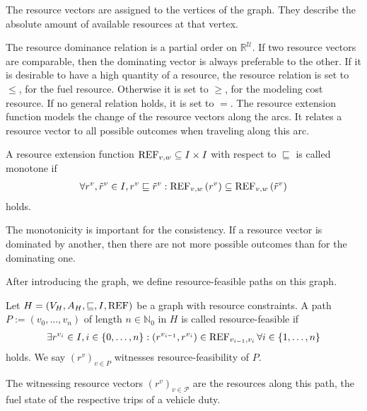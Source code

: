 The resource vectors are assigned to the vertices of the graph. They describe the absolute amount of available resources at that vertex.

The resource dominance relation is a partial order on $\mathbb{R}^{\mathcal{U}}$. If two resource vectors are comparable, then the dominating vector is always preferable to the other. If it is desirable to have a high quantity of a resource, the resource relation is set to $\leq$, \eg for the fuel resource. Otherwise it is set to $\geq$, \eg for the modeling cost resource. If no general relation holds, it is set to $=$. The resource extension function models the change of the resource vectors along the arcs. It relates a resource vector to all possible outcomes when traveling along this arc. 

\begin{definition}

A resource extension function ${\operatorname{REF}_{v,w}\subseteq I\times I}$ with respect to $\sqsubseteq$ is called monotone if
\begin{align*}
	\forall r^v,\tilde{r}^v\in I, r^v\sqsubseteq\tilde{r}^v : \operatorname{REF}_{v,w}\left(r^v\right)\subseteq\operatorname{REF}_{v,w}\left(\tilde{r}^v\right)
\end{align*}
holds.

\end{definition}

The monotonicity is important for the consistency. If a resource vector is dominated by another, then there are not more possible outcomes than for the dominating one.

After introducing the graph, we define resource-feasible paths on this graph.

\begin{definition}

Let ${H=\left(V_H,A_H,\sqsubseteq,I,\operatorname{REF}\right)}$ be a graph with resource constraints. A path ${P:=\left(v_0,\dots,v_n\right)}$ of length ${n\in\mathbb{N}_0}$ in $H$ is called resource-feasible if
\begin{align*}
	\exists r^{v_i}\in I,i\in\{0,\dots,n\}: \left(r^{v_{i-1}},r^{v_i}\right)\in\operatorname{REF}_{v_{i-1},v_i} \forall i\in\{1,\dots,n\}
\end{align*}
holds. We say $\left(r^v\right)_{v\in P}$ witnesses resource-feasibility of $P$.

\end{definition}

The witnessing resource vectors $\left(r^v\right)_{v\in\mathcal{P}}$ are the resources along this path, \eg the fuel state of the respective trips of a vehicle duty.

